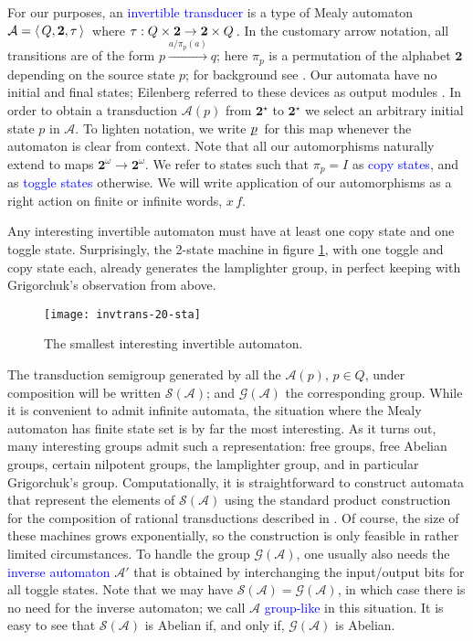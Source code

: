 \documentclass[12pt]{svmult}
\def\emph#1{\textcolor{blue}{#1}}
\def\2{\mathbf{2}}
\def\F#1{\underline{\smash{#1}}\,}       %
\def\SS{\Star{\2}}
\def\cA{\mathcal{A}}
\def\grp{\mathcal{G}}           %
\def\postomega#1{{#1}^\omega}
\def\sgr{\mathcal{S}}                %
\def\struct#1{ \left\langle \, {#1} \,\right\rangle\futurelet\next\mathcorr}
\def\trnp#1#2{{#1}{/}{#2}}
\def\mathcorr{\ifx\next.\mkern -.3mu\else\ifx\next,\mkern -.3mu\else\,\fi\fi}
\def\func#1#2#3{{#1}:{#2}\to{#3}\futurelet\next\mathcorr}
\providecommand{\Star}[1]{{#1}^{\star}}
\begin{document}
For our purposes, an \emph{invertible transducer} is a type of Mealy automaton 
$\cA = \struct{Q,\2,\tau}$ where $\func{\tau}{Q \times \2}{\2 \times Q}$. 
In the customary arrow notation, all transitions are of the form 
$p \xrightarrow{\trnp{a}{\pi_{p}(a)}} q$;
here $\pi_{p}$ is a permutation of the alphabet $\2$ depending on the source state $p$;
for background see 
\cite{Sakarovitch09:automata_theory,Berstel09:transductions_cfl,ElgotMezei65:relations_fa}.
Our automata have no initial and final states; Eilenberg referred to these devices as 
output modules \cite{Eilenberg74}. 
In order to obtain a transduction $\cA(p)$ from $\SS$ to $\SS$ 
we select an arbitrary initial state $p$ in $\cA$. 
To lighten notation, we write $\F{p}$ for this map 
whenever  the automaton is clear from context. 
Note that all our automorphisms naturally extend to maps $\postomega{\2}\to\postomega{\2}$. 
We refer to states such that $\pi_{p} = I$ as 
\emph{copy states}, and as \emph{toggle states} otherwise. 
We will write application of our automorphisms as a right action on finite or infinite words,  
$x \, f$.

Any interesting invertible automaton must have at least one copy state and one 
toggle state.
Surprisingly, the 2-state machine in figure \ref{fig:lamplighter}, with one 
toggle and copy state each, already generates the lamplighter group, in perfect 
keeping with Grigorchuk's observation from above. 

\begin{figure}[h]
  \centering
  \texttt{[image: invtrans-20-sta]}
  \caption{The smallest interesting invertible automaton.}
  \label{fig:lamplighter}
\end{figure}

The transduction semigroup generated by all the $\cA(p)$, $p \in Q$, under composition will 
be written $\sgr(\cA)$; and $\grp(\cA)$ the corresponding group. 
While it is convenient to admit infinite automata, the situation where the Mealy automaton 
has finite state set is by far the most interesting. 
As it turns out, many interesting groups admit such a representation:
free groups, free Abelian groups, certain nilpotent groups, the lamplighter 
group, and in particular Grigorchuk's group. 
Computationally, it is straightforward to construct automata that represent 
the elements of $\sgr(\cA)$ using the standard product construction for the 
composition of rational transductions described in \cite{ElgotMezei65:relations_fa}. 
Of course, the size of these machines grows exponentially, so the construction
is only feasible in rather limited circumstances. 
To handle the group $\grp(\cA)$, one usually also needs the \emph{inverse automaton}
$\cA'$ that is obtained by interchanging the input/output bits for all toggle states. 
Note that we may have  $\sgr(\cA) = \grp(\cA)$, in which case there is no need for 
the inverse automaton; we call $\cA$ \emph{group-like} in this situation. 
It is easy to see that  $\sgr(\cA)$ is Abelian if, and only if, $\grp(\cA)$ is Abelian. 
\end{document}
